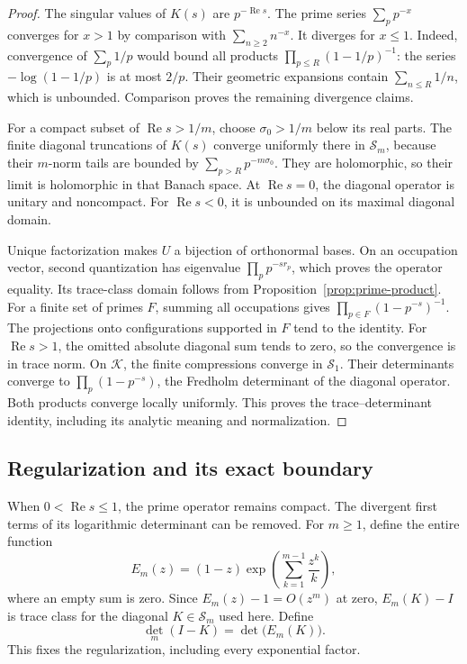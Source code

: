\begin{proof}
The singular values of \(K(s)\) are \(p^{-\operatorname{Re}s}\).
\label{proof:prime-harmonic}
The prime series \(\sum_p p^{-x}\) converges for \(x>1\) by comparison
with \(\sum_{n\geq2}n^{-x}\).  It diverges for \(x\leq1\).
Indeed, convergence of \(\sum_p1/p\) would bound all products
\(\prod_{p\leq R}(1-1/p)^{-1}\): the series
\(-\log(1-1/p)\) is at most \(2/p\).  Their geometric expansions contain
\(\sum_{n\leq R}1/n\), which is unbounded.  Comparison proves the
remaining divergence claims.

For a compact subset of \(\operatorname{Re}s>1/m\), choose
\(\sigma_0>1/m\) below its real parts.  The finite diagonal truncations
of \(K(s)\) converge uniformly there in \(\mathcal S_m\), because their
\(m\)-norm tails are bounded by \(\sum_{p>R}p^{-m\sigma_0}\).
They are holomorphic, so their limit is holomorphic in that Banach space.
At \(\operatorname{Re}s=0\), the diagonal operator is unitary and
noncompact.  For \(\operatorname{Re}s<0\), it is unbounded on its
maximal diagonal domain.

Unique factorization makes \(U\) a bijection of orthonormal bases.
On an occupation vector, second quantization has eigenvalue
\(\prod_p p^{-sr_p}\), which proves the operator equality.
Its trace-class domain follows from Proposition~\ref{prop:prime-product}.
For a finite set of primes \(F\), summing all occupations gives
\(\prod_{p\in F}(1-p^{-s})^{-1}\).  The projections onto configurations
supported in \(F\) tend to the identity.  For \(\operatorname{Re}s>1\),
the omitted absolute diagonal sum tends to zero, so the convergence is
in trace norm.  On \(\mathscr K\), the finite compressions converge in
\(\mathcal S_1\).  Their determinants converge to
\(\prod_p(1-p^{-s})\), the Fredholm determinant of the diagonal operator.
Both products converge locally uniformly.  This proves
the trace--determinant identity, including its analytic meaning and normalization.
\end{proof}

\subsection{Regularization and its exact boundary}

When \(0<\operatorname{Re}s\leq1\), the prime operator remains compact.
The divergent first terms of its logarithmic determinant can be removed.
For \(m\geq1\), define the entire function
\[
 E_m(z)=(1-z)\exp\left(\sum_{k=1}^{m-1}\frac{z^k}{k}\right),
\]
where an empty sum is zero.  Since \(E_m(z)-1=O(z^m)\) at zero,
\(E_m(K)-I\) is trace class for the diagonal \(K\in\mathcal S_m\)
used here.  Define
\[
 \det_m(I-K)=\det\bigl(E_m(K)\bigr).
\]
This fixes the regularization, including every exponential factor.

